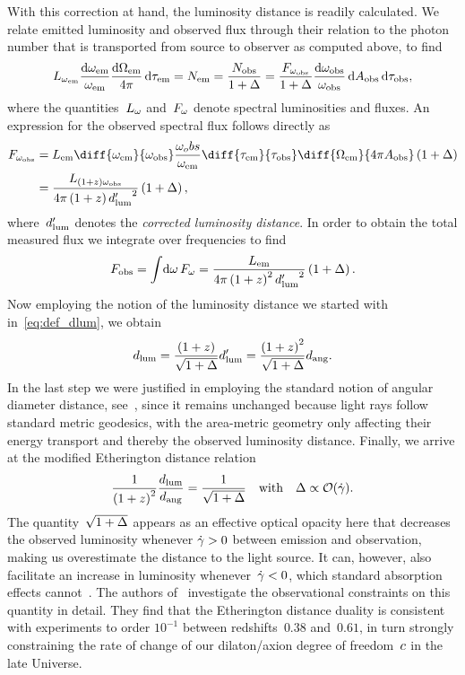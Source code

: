 With this correction at hand, the luminosity distance is readily calculated. We relate emitted luminosity and observed flux through their relation to the photon number that is transported from source to observer as computed above, to find
\begin{equation}
	\lum_{\freq_\src}\frac{\dif{\freq_\src}}{\freq_\src}\frac{\dif{\solangl_\src}}{4\pi}\dif{\prpt_\src}=\Nflux_\src=\frac{\Nflux_\obs}{1+\Dflux}=\frac{\flux_{\freq_\obs}}{1+\Dflux}\frac{\dif{\freq_\obs}}{\freq_\obs}\dif{\area_\obs}\dif{\prpt_\obs}
	\eqpunct{,}
\end{equation}
where the quantities~$L_\omega$ and~$F_\omega$ denote spectral luminosities and fluxes. An expression for the observed spectral flux follows directly as
\begin{align}
	\flux_{\freq_\obs} &=\lum_\src\diff{\freq_\src}{\freq_\obs}\frac{\freq_obs}{\freq_\src}\diff{\prpt_\src}{\prpt_\obs}\diff{\Omega_\src}{4\pi\area_\obs}\left(1+\Dflux\right) \\
	&=\frac{\lum_{\left(1+\reds\right)\freq_\obs}}{4\pi\left(1+\reds\right)\dlumcor^2}\left(1+\Dflux\right)
	\eqpunct{,}
\end{align}
where~${d'_\mathrm{lum}}$ denotes the \emph{corrected luminosity distance}. In order to obtain the total measured flux we integrate over frequencies to find
\begin{equation}
	\flux_\obs =\intd{\freq}\flux_\freq=\frac{\lum_\src}{4\pi\left(1+\reds\right)^2\dlumcor^2}\left(1+\Dflux\right)
	\eqpunct{.}
\end{equation}
Now employing the notion of the luminosity distance we started with in~\eqref{eq:def_dlum}, we obtain
\begin{equation}
	{d_\mathrm{lum}} =\frac{\left(1+z\right)}{\sqrt{1+\Delta}}{d'_\mathrm{lum}}=\frac{\left(1+z\right)^2}{\sqrt{1+\Delta}}{d_\mathrm{ang}}
	\mathpunct{.}
\end{equation}
In the last step we were justified in employing the standard notion of angular diameter distance, see~\autocite{SchneiderGravlens}, since it remains unchanged because light rays follow standard metric geodesics, with the area-metric geometry only affecting their energy transport and thereby the observed luminosity distance. Finally, we arrive at the modified Etherington distance relation
\begin{equation}
	\frac{1}{\left(1+z\right)^2}\frac{{d_\mathrm{lum}}}{{d_\mathrm{ang}}}=\frac{1}{\sqrt{1+\Delta}} \quad \text{with} \quad \Delta\propto\mathcal{O}(\dot{\gamma})
	\mathpunct{.}
\end{equation}
The quantity~$\sqrt{1+\Delta}$ appears as an effective optical opacity here that decreases the observed luminosity whenever $\dot{\gamma}>0$ between emission and observation, making us overestimate the distance to the light source. It can, however, also facilitate an increase in luminosity whenever~$\dot{\gamma}<0$, which standard absorption effects cannot~\autocite{EtheringtonBiref}. The authors of~\autocite{EtheringtonBiref} investigate the observational constraints on this quantity in detail. They find that the Etherington distance duality is consistent with experiments to order $10^{-1}$ between redshifts~$0.38$ and~$0.61$, in turn strongly constraining the rate of change of our dilaton/axion degree of freedom~$c$ in the late Universe.

